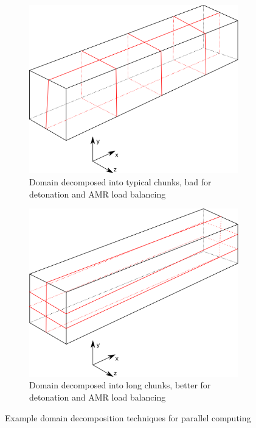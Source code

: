 \begin{figure}[p]
    \centering
    \begin{subfigure}[]{0.7\textwidth}
        \centering
        \includegraphics[width=\textwidth]{./figs/parallel_short.png}
        \caption{Domain decomposed into typical chunks, bad for detonation and AMR load balancing}
        \label{sfig:shortdecomp}
    \end{subfigure}

    \begin{subfigure}[]{0.7\textwidth}
        \centering
        \includegraphics[width=\textwidth]{./figs/parallel_long.png}
        \caption{Domain decomposed into long chunks, better for detonation and AMR load balancing}
        \label{sfig:longdecomp}
    \end{subfigure}
    \caption{Example domain decomposition techniques for parallel computing}
    \label{fig:decomp}
\end{figure}%

